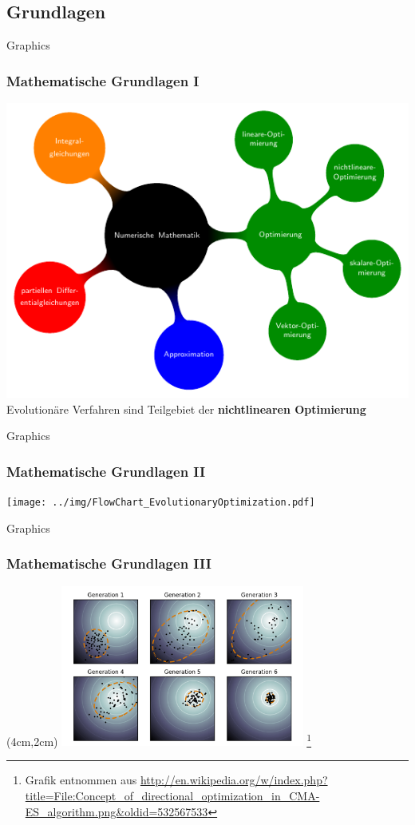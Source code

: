 \subsection{Grundlagen}
\begin{frame}{Graphics} 
	\frametitle{Mathematische Grundlagen I }
	\centering
	\includegraphics[page=1, width=.6\textwidth]{../img/mindmap.pdf}\\
	\tiny Evolutionäre Verfahren sind Teilgebiet der \textbf{nichtlinearen Optimierung}
\end{frame}
\begin{frame}{Graphics} 
  	\frametitle{Mathematische Grundlagen II}
  	\centering
	\texttt{[image: ../img/FlowChart\_EvolutionaryOptimization.pdf]}
\end{frame}
\begin{frame}{Graphics} 
  	\frametitle{Mathematische Grundlagen III}
%  	
  	\begin{textblock*}{8cm}(4cm,2cm) %
  		\includegraphics[width=8cm]{../img/Concept_of_directional_optimization_in_CMA-ES_algorithm.png}
  		\footnote{Grafik entnommen aus \url{http://en.wikipedia.org/w/index.php?title=File:Concept_of_directional_optimization_in_CMA-ES_algorithm.png&oldid=532567533}}
  	\end{textblock*}
%  	
\end{frame}
